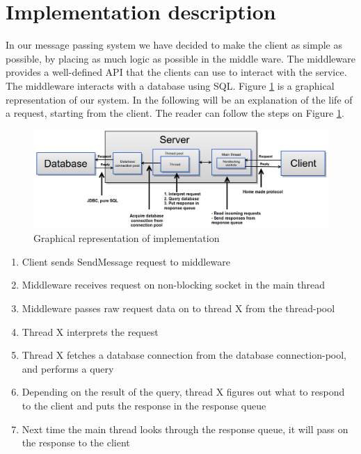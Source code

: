 \documentclass{article}
\begin{document}
    \maketitle
    \tableofcontents

    \section{Implementation description}
        In our message passing system we have decided to make the client as simple as possible, by placing as much logic as possible in the middle ware. The middleware provides a well-defined API that the clients can use to interact with the service. The middleware interacts with a database using SQL. Figure \ref{fig:implementation_high_level} is a graphical representation of our system. In the following will be an explanation of the life of a request, starting from the client. The reader can follow the steps on Figure \ref{fig:implementation_high_level}.
         \begin{figure}[H]
            \hspace{-2.8cm}
             \includegraphics[scale=0.50]{implementation_high_level}
             \caption{Graphical representation of implementation}
             \label{fig:implementation_high_level}
         \end{figure}
         \begin{enumerate}
             \item Client sends SendMessage request to middleware
             \item Middleware receives request on non-blocking socket in the main thread
             \item Middleware passes raw request data on to thread X from the thread-pool
             \item Thread X interprets the request
             \item Thread X fetches a database connection from the database connection-pool, and performs a query
             \item Depending on the result of the query, thread X figures out what to respond to the client and puts the response in the response queue
             \item Next time the main thread looks through the response queue, it will pass on the response to the client
         \end{enumerate}
\end{document}
